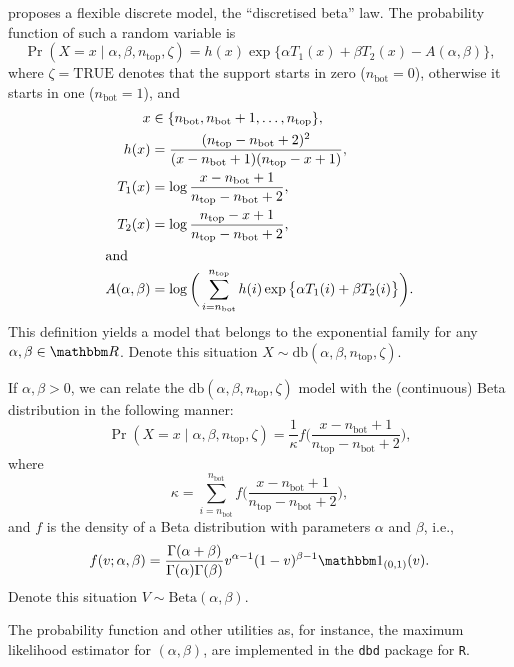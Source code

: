 \documentclass[12pt]{article}
\begin{document}
\citet{ANewVersatileDiscreteDistribution} proposes a flexible discrete model, the ``discretised beta'' law.
The probability function of such a random variable is
\begin{equation}
\Pr(X  = x \mid \alpha, \beta, n_{\text{top}}, \zeta) = h(x) \exp\big\{ \alpha T_1(x) + \beta T_2(x) - A(\alpha, \beta) \big\},
\label{Eq:ProbdbExponential}
\end{equation}
where $\zeta=\text{TRUE}$ denotes that the support starts in zero ($n_{\text{bot}}=0$), otherwise it starts in one ($n_{\text{bot}}=1$), and
\begin{align}
x &\in \{n_{\text{bot}}, n_{\text{bot}}+1, \dots, n_{\text{top}}\},\\
h(x) & =\frac{(n_{\text{top}} - n_{\text{bot}}+2)^2}{
(x-n_{\text{bot}}+1)	(n_{\text{top}}-x+1)	},\\
T_1(x) &= \log\frac{x-n_{\text{bot}}+1}{n_{\text{top}}-n_{\text{bot}}+2}, \\
T_2(x) &= \log\frac{n_{\text{top}}-x+1}{n_{\text{top}}-n_{\text{bot}}+2}, \\
\intertext{and}
A(\alpha,\beta) &= \log \bigg(
\sum_{i=n_{\text{bot}}}^{n_{\text{top}}} h(i) \exp\big\{ \alpha T_1(i) + \beta T_2(i)\big\}
\bigg).
\end{align}
This definition yields a model that belongs to the exponential family for any $\alpha,\beta\in\mathbbm R$.
Denote this situation $X\sim\text{db}(\alpha,\beta, n_{\text{top}},\zeta)$.

If $\alpha,\beta>0$, we can relate the $\text{db}(\alpha,\beta, n_{\text{top}},\zeta)$ model with the (continuous) Beta distribution in the following manner:
\begin{equation}
\Pr(X=x \mid \alpha, \beta, n_{\text{top}}, \zeta) = 
\frac{1}{\kappa} f\Big(
\frac{x-n_{\text{bot}}+1}{n_{\text{top}}-n_{\text{bot}}+2}
\Big),
\label{Eq:Probdb}
\end{equation}
where
$$
\kappa = \sum_{i=n_{\text{bot}}}^{n_{\text{bot}}} f\Big(
\frac{x-n_{\text{bot}}+1}{n_{\text{top}}-n_{\text{bot}}+2}
\Big),
$$
and $f$ is the density of a Beta distribution with parameters $\alpha$ and $\beta$, i.e.,
\begin{equation}
	f(v;\alpha, \beta) = \frac{\Gamma(\alpha+\beta)}{\Gamma(\alpha)\Gamma(\beta)} v^{\alpha-1} (1-v)^{\beta-1} \mathbbm 1_{(0,1)}(v).
	\label{Eq:DensBeta}
\end{equation}
Denote this situation $V\sim\text{Beta}(\alpha,\beta)$.

The probability function and other utilities as, for instance, the maximum likelihood estimator for $(\alpha,\beta)$, are implemented in the \texttt{dbd} package for \texttt{R}.
\end{document}

